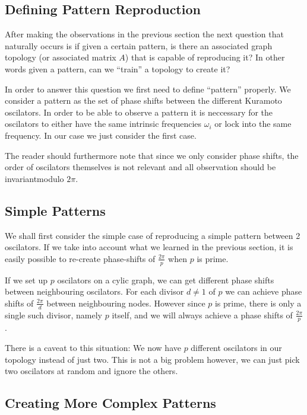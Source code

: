 \label{sec:patterns}

\subsection{Defining Pattern Reproduction}

After making the observations in the previous section the next question that naturally occurs is if given a certain pattern, is there an associated graph topology (or associated matrix $A$) that is capable of reproducing it? In other words given a pattern, can we ``train'' a topology to create it?

In order to answer this question we first need to define ``pattern'' properly. We consider a pattern as the set of phase shifts between the different Kuramoto oscilators. In order to be able to observe a pattern it is neccessary for the oscilators to either have the same intrinsic frequencies $\omega_i$ or lock into the same frequency. In our case we just consider the first case. 

The reader should furthermore note that since we only consider phase shifts, the order of oscilators themselves is not relevant and all observation should be invariantmodulo $2\pi$. 

\subsection{Simple Patterns}

We shall first consider the simple case of reproducing a simple pattern between 2 oscilators. If we take into account what we learned in the previous section, it is easily possible to re-create phase-shifts of $\frac{2\pi}{p}$ when $p$ is prime. 

If we set up $p$ oscilators on a cylic graph, we can get different phase shifts between neighbouring oscilators. For each divisor $d \neq 1$ of $p$ we can achieve phase shifts of $\frac{2\pi}{d}$ between neighbouring nodes. However since $p$ is prime, there is only a single such divisor, namely $p$ itself, and we will always achieve a phase shifts of $\frac{2\pi}{p}$. 

There is a caveat to this situation: We now have $p$ different oscilators in our topology instead of just two. This is not a big problem however, we can just pick two oscilators at random and ignore the others. 

\subsection{Creating More Complex Patterns}

